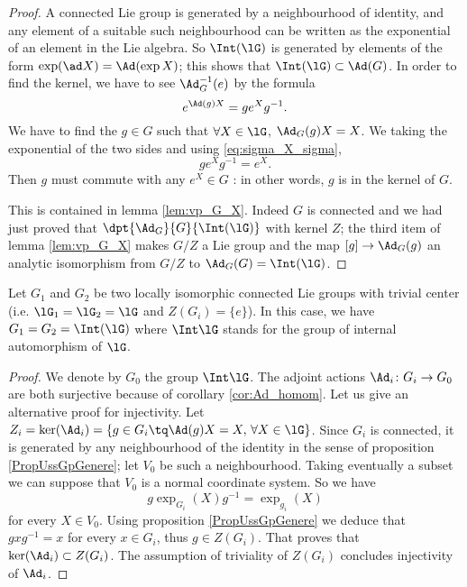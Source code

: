 \begin{proof}
A connected Lie group is generated by a neighbourhood of identity, and any element of a suitable such neighbourhood can be written as the exponential of an element in the Lie algebra. So $\Int(\lG)$ is generated by elements of the form $\exp(\ad X)=\Ad(\exp X)$; this shows that $\Int(\lG)\subset\Ad(G)$. In order to find the kernel, we have to  see $\Ad_G^{-1}(e)$ by the formula 
\[ 
   e^{\Ad(g)X}=g e^Xg^{-1}.
\]
We have to find the $g\in G$ such that $\forall X\in\lG$, $\Ad_G(g)X=X$. We taking the exponential of the two sides and using \eqref{eq:sigma_X_sigma},
\begin{equation}
  g e^Xg^{-1}=e^X.
\end{equation}
Then $g$ must commute with any $e^X\in G$ : in other words, $g$ is in the kernel of $G$.

This is contained in lemma \ref{lem:vp_G_X}. Indeed $G$ is connected and we had just proved that $\dpt{\Ad_G}{G}{\Int(\lG)}$ with kernel $Z$; the third item of lemma \ref{lem:vp_G_X} makes $G/Z$ a Lie group and the map $[g]\to\Ad_G(g)$ an analytic isomorphism from $G/Z$ to $\Ad_G(G)=\Int(\lG)$.
\end{proof}


\begin{lemma}
Let $G_1$ and $G_2$ be two locally isomorphic connected Lie groups with trivial center (i.e. $\lG_1=\lG_2=\lG$ and $Z(G_i)=\{ e \}$). In this case, we have $G_1=G_2=\Int(\lG)$ where $\Int\lG$ stands for the group of internal automorphism of $\lG$.
\end{lemma}

\begin{proof}
We denote by $G_0$ the group $\Int\lG$. The adjoint actions $\Ad_i\colon G_i\to G_0$ are both surjective because of corollary \ref{cor:Ad_homom}. Let us give an alternative proof for injectivity. Let $Z_i=\ker(\Ad_i)=\{ g\in G_i\tq\Ad(g)X=X,\,\forall X\in\lG \}$. Since $G_i$ is connected, it is generated by any neighbourhood of the identity in the sense of proposition \ref{PropUssGpGenere}; let $V_0$ be such a neighbourhood. Taking eventually a subset we can suppose that $V_0$ is a normal coordinate system. So we have
\[ 
  g\exp_{G_i}(X)g^{-1}=\exp_{g_i}(X)
\]
for every $X\in V_0$. Using proposition \ref{PropUssGpGenere} we deduce that $gxg^{-1}=x$ for every $x\in G_i$, thus $g\in Z(G_i)$. That proves that $\ker(\Ad_i)\subset Z(G_i)$. The assumption of triviality of $Z(G_i)$ concludes injectivity of $\Ad_i$.
\end{proof}

